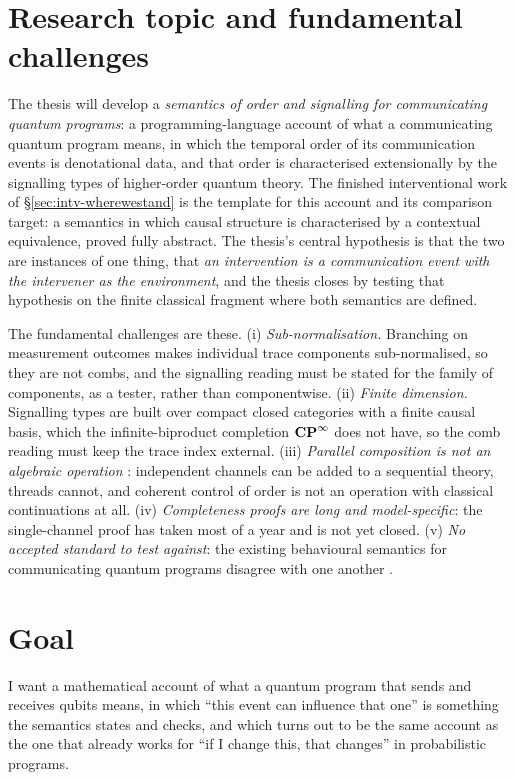 \section{Research topic and fundamental challenges}

The thesis will develop a \emph{semantics of order and signalling for communicating quantum programs}: a programming-language account of what a communicating quantum program means, in which the temporal order of its communication events is denotational data, and that order is characterised extensionally by the signalling types of higher-order quantum theory. The finished interventional work of \S\ref{sec:intv-wherewestand} is the template for this account and its comparison target: a semantics in which causal structure is characterised by a contextual equivalence, proved fully abstract. The thesis's central hypothesis is that the two are instances of one thing, that \emph{an intervention is a communication event with the intervener as the environment}, and the thesis closes by testing that hypothesis on the finite classical fragment where both semantics are defined.

The fundamental challenges are these. (i) \emph{Sub-normalisation.} Branching on measurement outcomes makes individual trace components sub-normalised, so they are not combs, and the signalling reading must be stated for the family of components, as a tester, rather than componentwise. (ii) \emph{Finite dimension.} Signalling types are built over compact closed categories with a finite causal basis, which the infinite-biproduct completion $\mathbf{CP}^{\infty}$ does not have, so the comb reading must keep the trace index external. (iii) \emph{Parallel composition is not an algebraic operation} \cite{stark:freamp,CSP_van_Glabbeek_2010}: independent channels can be added to a sequential theory, threads cannot, and coherent control of order is not an operation with classical continuations at all. (iv) \emph{Completeness proofs are long and model-specific}: the single-channel proof has taken most of a year and is not yet closed. (v) \emph{No accepted standard to test against}: the existing behavioural semantics for communicating quantum programs disagree with one another \cite{lqCCS_10.1145/3632885}.

\section{Goal}

I want a mathematical account of what a quantum program that sends and receives qubits means, in which ``this event can influence that one'' is something the semantics states and checks, and which turns out to be the same account as the one that already works for ``if I change this, that changes'' in probabilistic programs.

